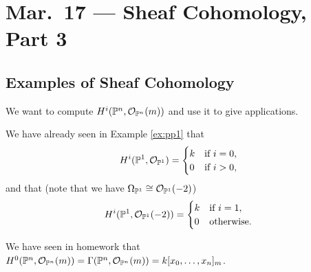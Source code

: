\chapter{Mar.~17 --- Sheaf Cohomology, Part 3}

\section{Examples of Sheaf Cohomology}

\begin{remark}
  We want to
  compute $H^i(\mathbb{P}^n, \mathcal{O}_{\mathbb{P}^n}(m))$
  and use it to give applications.
\end{remark}

\begin{example}
  We have already seen
  in Example \ref{ex:pp1} that
  \[
    H^i(\mathbb{P}^1, \mathcal{O}_{\mathbb{P}^1})
    =
    \begin{cases}
      k & \text{if } i = 0, \\
      0 & \text{if } i > 0,
    \end{cases}
  \]
  and that (note that we have
  $\Omega_{\mathbb{P}^1} \cong \mathcal{O}_{\mathbb{P}^1}(-2)$)
  \[
    H^i(\mathbb{P}^1, \mathcal{O}_{\mathbb{P}^1}(-2))
    = \begin{cases}
      k & \text{if } i = 1, \\
      0 & \text{otherwise}.
    \end{cases}
  \]
\end{example}

\begin{example}
  We have seen in homework that
  $H^0(\mathbb{P}^n, \mathcal{O}_{\mathbb{P}^n}(m)) = \Gamma(\mathbb{P}^n, \mathcal{O}_{\mathbb{P}^n}(m)) = k[x_0, \dots, x_n]_m$.
\end{example}

